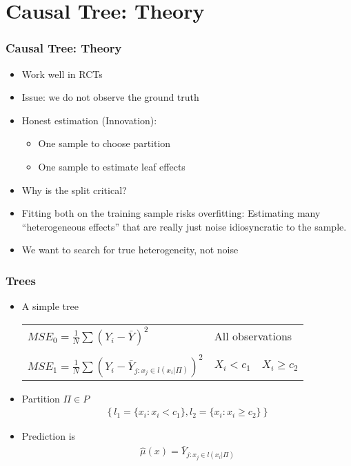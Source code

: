 \documentclass[
  shownotes,
  xcolor={svgnames},
  hyperref={colorlinks,citecolor=DarkBlue,linkcolor=DarkRed,urlcolor=DarkBlue}
  , aspectratio=169]{beamer}
\begin{document}
\section{Causal Tree: Theory}
\begin{frame}[fragile]
\frametitle{Causal Tree: Theory}



\begin{itemize}
  \item Work well in RCTs
  \medskip
  \item Issue: we do not observe the ground truth
  \medskip
  \item Honest estimation (Innovation):
    \begin{itemize}
      \item One sample to choose partition 
      \medskip
      \item One sample to estimate leaf effects
      \medskip
    \end{itemize}
  \item Why is the split critical?
  \medskip
  \item Fitting both on the training sample risks overfitting: Estimating many “heterogeneous effects” that are really just noise idiosyncratic to the sample.
  \medskip
  \item We want to search for true heterogeneity, not noise
\end{itemize}

\end{frame}
\begin{frame}[fragile]
\frametitle{Trees}
\begin{itemize}
\item A simple tree

\begin{table}[]
\begin{tabular}{lll}
$MSE_0=\frac{1}{N}\sum(Y_i-\bar{Y})^2$ & \multicolumn{2}{l}{All observations} \\
\\
$MSE_1=\frac{1}{N}\sum(Y_i-\bar{Y}_{j:x_j\in l(x_i|\Pi)})^2$   & $X_i < c_1$      & $X_i \geq c_2$    
\end{tabular}
\end{table}
\bigskip
\item Partition $\Pi \in P$
  \begin{align}
  \left\{l_1=\{x_i : x_i< c_1\},l_2=\{x_i : x_i \geq c_2\} \right\}
  \end{align}
\item Prediction is 
  \begin{align}
  \hat{\mu}(x)=\bar{Y}_{j:x_j\in l(x_i|\Pi)}
  \end{align}

\end{itemize}
\end{frame}
\end{document}
